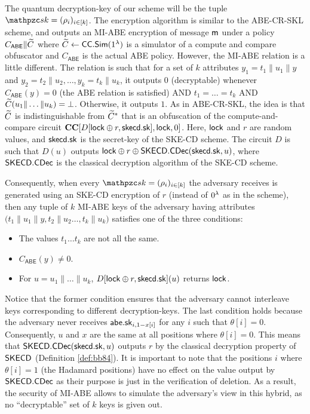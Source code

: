 The quantum decryption-key of our scheme will be the tuple $\qsk =
(\rho_i)_{i \in [k]}$. The encryption algorithm is similar to the
ABE-CR-SKL scheme, and outputs an MI-ABE encryption of message $\mathsf{m}$
under a policy $C_{\mathsf{ABE}} \| \widetilde{C}$ where $\widetilde{C} \leftarrow
\mathsf{CC}.\mathsf{Sim}(1^\lambda)$ is a simulator of a compute and compare obfuscator and $C_{\mathsf{ABE}}$ is the actual ABE policy.
However, the MI-ABE relation is a little different. The relation is
such that for a set of $k$ attributes $y_1 = t_1 \| u_1 \| y$ and $y_2
= t_2 \| u_2, \ldots, y_k = t_k \| u_k$, it outputs $0$ (decryptable)
whenever $C_{\mathsf{ABE}}(y) = 0$ (the ABE relation is satisfied) AND $t_1 = \ldots = t_k$ AND
$\widetilde{C}(u_1 \| \ldots \| u_k) = \bot$.  Otherwise, it outputs $1$. As in
ABE-CR-SKL, the idea is that $\widetilde{C}$ is indistinguishable from $\widetilde{C}^*$
that is an obfuscation of the compute-and-compare circuit
$\mathbf{CC}[D[\mathsf{lock} \oplus r, \mathsf{skecd}.\mathsf{sk}],\mathsf{lock}, 0]$.  Here, $\mathsf{lock}$ and $r$ are
random values, and $\mathsf{skecd}.\mathsf{sk}$ is the secret-key of the SKE-CD scheme.  The
circuit $D$ is such that $D(u)$ outputs $\mathsf{lock} \oplus r \oplus
\mathsf{SKECD}.\mathsf{CDec}(\mathsf{skecd}.\mathsf{sk}, u)$, where $\mathsf{SKECD}.\mathsf{CDec}$ is the classical
decryption algorithm of the SKE-CD scheme.

Consequently, when every $\qsk = (\rho_i)_{i\in[k]}$ the adversary
receives is generated using an SKE-CD encryption of $r$ (instead of
$0^\lambda$ as in the scheme), then any tuple of $k$ MI-ABE keys of the
adversary having attributes $\big(t_1 \| u_1 \| y, t_2 \| u_2 \ldots, t_k \| u_k\big)$
satisfies one of the three conditions:

\begin{itemize}
\item The values $t_1 \ldots t_k$ are not all the same.
\item $C_{\mathsf{ABE}}(y) \neq 0$.
\item For $u = u_1 \| \ldots \| u_k$, $D[\mathsf{lock} \oplus r, \mathsf{skecd}.\mathsf{sk}](u)$
returns $\mathsf{lock}$.
\end{itemize}

Notice that the former condition ensures that the adversary cannot
interleave keys corresponding to different decryption-keys.
The last condition holds because the adversary never receives
$\mathsf{abe}.\mathsf{sk}_{i, 1 - x[i]}$ for any $i$ such that $\theta[i] = 0$.
Consequently, $u$ and $x$ are the same at all positions where
$\theta[i]=0$. This means that $\mathsf{SKECD}.\mathsf{CDec}(\mathsf{skecd}.\mathsf{sk}, u)$ outputs $r$ by the
classical decryption property of $\mathsf{SKECD}$ (Definition \ref{def:bb84}).
It is important to note that the positions $i$ where $\theta[i] = 1$
(the Hadamard positions) have no effect on the value output by
$\mathsf{SKECD}.\mathsf{CDec}$
as their purpose is just in the verification of deletion.
As a result, the security of
MI-ABE allows to simulate the adversary's view in this hybrid, as
no ``decryptable'' set of $k$ keys is given out.

